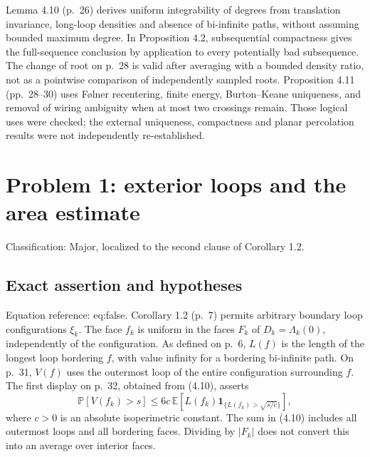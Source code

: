 \documentclass[10pt]{article}
\begin{document}
Lemma 4.10 (p. 26) derives uniform integrability of degrees from translation invariance, long-loop densities and absence of bi-infinite paths, without assuming bounded maximum degree. In Proposition 4.2, subsequential compactness gives the full-sequence conclusion by application to every potentially bad subsequence. The change of root on p. 28 is valid after averaging with a bounded density ratio, not as a pointwise comparison of independently sampled roots. Proposition 4.11 (pp. 28–30) uses Følner recentering, finite energy, Burton–Keane uniqueness, and removal of wiring ambiguity when at most two crossings remain. Those logical uses were checked; the external uniqueness, compactness and planar percolation results were not independently re-established.\par
\section*{Problem 1: exterior loops and the area estimate}
Classification: Major, localized to the second clause of Corollary 1.2.\par
\subsection*{Exact assertion and hypotheses}
Equation reference: eq:false. Corollary 1.2 (p. 7) permits arbitrary boundary loop configurations \(\xi_k\). The face \(f_k\) is uniform in the faces \(F_k\) of \(D_k=\Lambda_k(0)\), independently of the configuration. As defined on p. 6, \(L(f)\) is the length of the longest loop bordering \(f\), with value infinity for a bordering bi-infinite path. On p. 31, \(V(f)\) uses the outermost loop of the entire configuration surrounding \(f\). The first display on p. 32, obtained from (4.10), asserts \[
\mathbb P[V(f_k)>s]\le6c\,\mathbb E[
 L(f_k)\mathbf1_{\{L(f_k)>\sqrt{s/c}\}}],\] where \(c>0\) is an absolute isoperimetric constant. The sum in (4.10) includes all outermost loops and all bordering faces. Dividing by \(|F_k|\) does not convert this into an average over interior faces.\par
\end{document}
